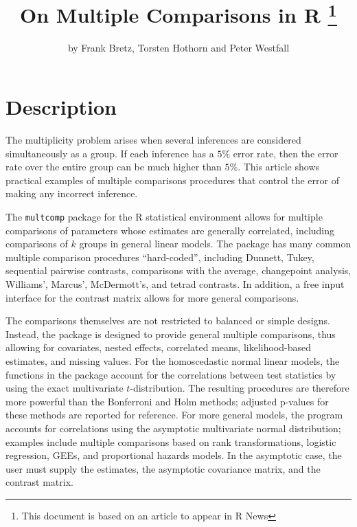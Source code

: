 \documentclass{article}
\begin{document}
\title{On Multiple Comparisons in \textsf{R} \thanks{This document is based
on an article to appear in \textsf{R} News} }
\author{by Frank Bretz, Torsten Hothorn and Peter Westfall}
\date{}
\maketitle


\section{Description}

The multiplicity problem arises when several inferences are considered
simultaneously as a group.  If each inference has a $5\%$ error rate, 
then the error rate over the entire group can be much higher than $5\%$.  
This article shows practical examples of multiple comparisons 
procedures that control the error of making any incorrect inference.

The \texttt{multcomp} package for the \textsf{R} statistical
environment allows for multiple comparisons of parameters whose
estimates are generally correlated, including comparisons of $k$
groups in general linear models. The package has many common
multiple comparison procedures ``hard-coded'', including Dunnett,
Tukey, sequential pairwise contrasts, comparisons with the
average, changepoint analysis, Williams', Marcus', McDermott's,
and tetrad contrasts. In addition, a free input interface for the
contrast matrix allows for more general comparisons.

The comparisons themselves are not restricted to balanced or simple
designs. Instead, the package is designed to provide general
multiple comparisons, thus allowing for covariates, nested
effects, correlated means, likelihood-based estimates, and missing
values. For the homoscedastic normal linear models, the functions in the package
account for the correlations between test statistics by using the
exact multivariate $t$-distribution. The resulting procedures are
therefore more powerful than the Bonferroni and Holm methods;
adjusted p-values for these methods are reported for reference.
For more general models,  the program accounts for correlations
using the asymptotic multivariate normal distribution; examples
include multiple comparisons based on rank transformations,
logistic regression, GEEs, and proportional hazards models.  In
the asymptotic case, the user must supply the estimates, the
asymptotic covariance matrix, and the contrast matrix.
\end{document}

